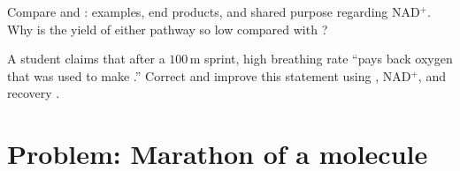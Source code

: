 \begin{exercise}[$\star\star$]\label{exo:g10:cellular-respiration:12}
Compare  and : 
examples, end products, and shared purpose regarding NAD$^+$. Why is the
 yield of either pathway so low compared with ?
\end{exercise}

\begin{exercise}[$\star\star\star$]\label{exo:g10:cellular-respiration:13}
A student claims that after a $100\,\mathrm{m}$ sprint, high breathing
rate ``pays back oxygen that was used to make .'' Correct and
improve this statement using , NAD$^+$, and recovery
.
\end{exercise}

\section{Problem: Marathon of a molecule}

